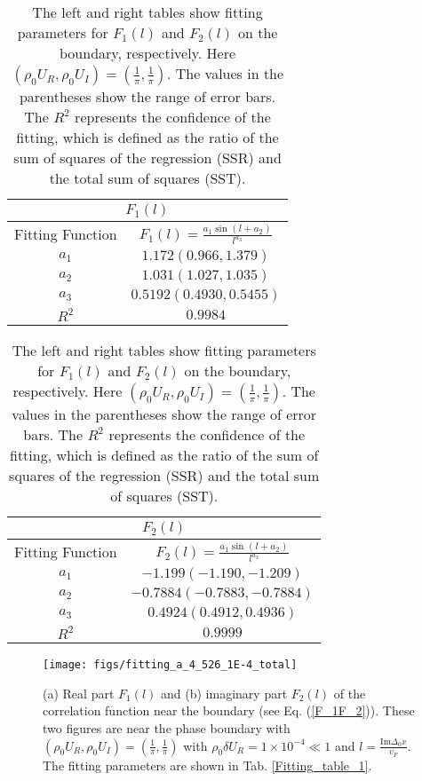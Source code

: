 \documentclass[aps,onecolumn,nofootinbib,superscriptaddress,notitlepage,longbibliography]{revtex4-1}
\begin{document}
\begin{table}
	\begin{tabular}{|c|c|}
		\hline 
		\multicolumn{2}{|c|}{$F_{1}(l)$}\tabularnewline
		\hline
		\hline 
		Fitting Function & $F_1(l)=\frac{a_{1}\sin(l+a_{2})}{l^{a_{3}}}$\tabularnewline
		\hline 
		$a_{1}$ & $1.172(0.966,1.379)$\tabularnewline
		\hline 
		$a_{2}$ & $1.031(1.027,1.035)$\tabularnewline
		\hline 
		$a_{3}$ & $0.5192(0.4930,0.5455)$\tabularnewline
		\hline 
		$R^{2}$ & $0.9984$\tabularnewline
		\hline 
	\end{tabular}%
	\begin{tabular}{|c|c|}
		\hline 
		\multicolumn{2}{|c|}{$F_{2}(l)$}\tabularnewline
		\hline 
		\hline
		Fitting Function & $F_{2}(l)=\frac{a_{1}\sin(l+a_{2})}{l^{a_{3}}}$\tabularnewline
		\hline 
		$a_{1}$ & $-1.199(-1.190,-1.209)$\tabularnewline
		\hline 
		$a_{2}$ & $-0.7884(-0.7883,-0.7884)$\tabularnewline
		\hline 
		$a_{3}$ & $0.4924(0.4912,0.4936)$\tabularnewline
		\hline 
		$R^{2}$ & $0.9999$\tabularnewline
		\hline 
	\end{tabular}
	
	\caption{The left and right tables show fitting parameters for $F_1(l)$ and $F_2(l)$ on the boundary, respectively. Here $(\rho_{0}U_{R},\rho_{0}U_{I})=(\frac{1}{\pi},\frac{1}{\pi})$. The values in the parentheses show the range of error bars. The $R^2$ represents the confidence of the fitting, which is defined as the ratio of the sum of squares of the regression (SSR) and the total sum of squares (SST).}
	
	\label{fitting_table_2}
\end{table}
\begin{figure}[t]
	\centering \texttt{[image: figs/fitting\_a\_4\_526\_1E-4\_total]}
	\caption{(a) Real part $F_1(l)$ and (b) imaginary part $F_2(l)$ of the correlation function near the boundary (see Eq. (\ref{F_1F_2})). These two figures are near the phase boundary with $(\rho_{0}U_{R},\rho_{0}U_{I})=(\frac{1}{\pi},\frac{1}{\pi})$ with $\rho_{0}\delta U_{R}=1\times10^{-4}\ll1$ and $l=\frac{\text{Im}\Delta_0x}{v_F}.$ The fitting parameters are shown in Tab. \ref{Fitting_table_1}.}
	\label{fig1}
\end{figure}
\end{document}
